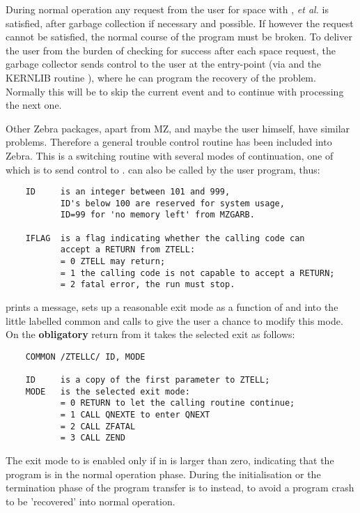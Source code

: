 During normal operation any request from the user for space
with ,  {\it et al.} is satisfied,
after garbage collection if necessary and possible.
If however the request cannot be satisfied,
the normal course of the program must be broken.
To deliver the user from the burden of checking for success
after each space request,
the garbage collector sends control to the user at the
entry-point  (via  
and the KERNLIB routine ),
where he can program the recovery of the problem.
Normally this will be to skip the current event and to continue
with processing the next one.

Other Zebra packages, apart from MZ, and maybe the user himself,
have similar problems.
Therefore a general trouble control routine  has been
included into Zebra.
This is a switching routine with several modes of continuation,
one of which is to send control to .
 can also be called by the user program, thus:


\begin{verbatim}
    ID     is an integer between 101 and 999,
           ID's below 100 are reserved for system usage,
           ID=99 for 'no memory left' from MZGARB.

    IFLAG  is a flag indicating whether the calling code can
           accept a RETURN from ZTELL:
           = 0 ZTELL may return;
           = 1 the calling code is not capable to accept a RETURN;
           = 2 fatal error, the run must stop.
\end{verbatim} 

 prints a message,
sets up a reasonable exit mode as a function of  
and  into the little labelled common 
and calls  to give the user a chance to modify this mode.
On the \textbf{obligatory}
return from  it takes the selected exit as follows:

\begin{verbatim}
    COMMON /ZTELLC/ ID, MODE

    ID     is a copy of the first parameter to ZTELL;
    MODE   is the selected exit mode:
           = 0 RETURN to let the calling routine continue;
           = 1 CALL QNEXTE to enter QNEXT
           = 2 CALL ZFATAL
           = 3 CALL ZEND
\end{verbatim} 

The exit mode to  is enabled only if  in 
is larger than zero, indicating that the program is
in the normal operation phase.
During the initialisation or the termination phase of the program
transfer is to  instead,
to avoid a program crash to be 'recovered' into normal operation.

